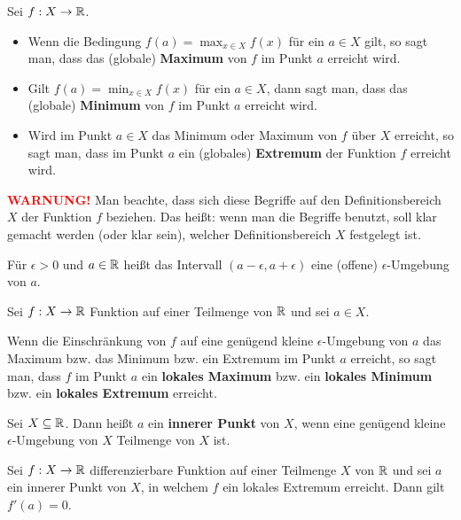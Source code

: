 \begin{defn} 
	Sei $f : X \to \mathbb{R}$. 
	
	\begin{itemize} 
		\item[] Wenn die Bedingung $f(a) = \max_{x \in X}  f(x)$ für ein $a \in X$ gilt, so sagt man, dass das (globale) \textbf{Maximum} von $f$ im Punkt $a$ erreicht wird. 
		\item[] Gilt $f(a) = \min_{x \in X} f(x)$ für ein $a \in X$, dann sagt man, dass das (globale) \textbf{Minimum} von $f$ im Punkt $a$ erreicht wird. 
		\item[]	Wird im Punkt $a \in X$ das Minimum oder Maximum von $f$ über $X$ erreicht, so sagt man, dass im Punkt $a$ ein (globales) \textbf{Extremum} der Funktion $f$ erreicht wird. 
	\end{itemize} 
	
	{\textcolor{red}{\textbf{WARNUNG!}}} Man beachte, dass sich diese Begriffe auf den Definitionsbereich $X$ der Funktion $f$ beziehen. Das heißt: wenn man die Begriffe benutzt, soll klar gemacht werden (oder klar sein), welcher Definitionsbereich $X$ festgelegt ist. 
\end{defn} 

\begin{defn} 
	Für $\epsilon > 0$ und $a \in \mathbb{R}$ heißt das Intervall $(a-\epsilon, a + \epsilon)$ eine (offene) $\epsilon$-Umgebung von $a$. 
\end{defn} 

\begin{defn}
	Sei $f : X \to \mathbb{R}$ Funktion auf einer Teilmenge von $\mathbb{R}$ und sei $a \in X$. 
	
	Wenn die Einschränkung von $f$ auf eine genügend kleine $\epsilon$-Umgebung von $a$ das Maximum bzw. das Minimum bzw. ein Extremum im Punkt $a$ erreicht, so sagt man, dass $f$ im Punkt $a$ ein \textbf{lokales Maximum} bzw. ein \textbf{lokales Minimum} bzw. ein \textbf{lokales Extremum} erreicht. 	
\end{defn} 

\begin{defn} 
	Sei $X \subseteq \mathbb{R}$. Dann heißt $a$ ein \textbf{innerer Punkt} von $X$, wenn eine genügend kleine $\epsilon$-Umgebung von $X$ Teilmenge von $X$ ist. 
\end{defn} 

\begin{thm} Sei $f : X \to \mathbb{R}$ differenzierbare Funktion auf einer Teilmenge $X$ von $\mathbb{R}$ und sei $a$ ein innerer Punkt von $X$, in welchem $f$ ein lokales Extremum erreicht. Dann gilt $f'(a) = 0$. 
\end{thm} 

